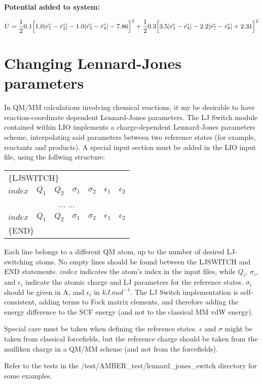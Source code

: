     \textbf{Potential added to system:}

    \begin{equation}
      U=\frac{1}{2} 0.1 \Big{[} 1.0 |\vec{r_1} - \vec{r_2}| - 1.0 |\vec{r_3} - \vec{r_4}| - 7.86\Big{]}^2 + \frac{1}{2} 0.3 \Big{[} 3.5 |\vec{r_1} - \vec{r_3}| - 2.2 |\vec{r_7} - \vec{r_8}| +2.31\Big{]}^2 
      \label{Ex3}
    \end{equation}

\section{Changing Lennard-Jones parameters}
In QM/MM calculations involving chemical reactions, it my be desirable to have reaction-coordinate dependent Lennard-Jones parameters.
The LJ Switch module contained within LIO implements a charge-dependent Lennard-Jones parameters scheme, interpolating said parameters
between two reference states (for example, reactants and products).
A special input section must be added in the LIO input file, using the follwing structure:

    \begin{table}  [H]
      \begin{center}
      \begin{tabular}{ c c c c c c c}
         \multicolumn{7}{l}{\{LJSWITCH\}} \\
         $index$ & $Q_{1}$ & $Q_{2}$ & $\sigma_{1}$ & $\sigma_{2}$ & $\epsilon_{1}$ &  $\epsilon_{2}$ \\
         \multicolumn{7}{c}{... ...} \\
         $index$ & $Q_{1}$ & $Q_{2}$ & $\sigma_{1}$ & $\sigma_{2}$ & $\epsilon_{1}$ &  $\epsilon_{2}$ \\
         \multicolumn{7}{l}{\{END\}} \\
       \end{tabular}
       \end{center}
      \label{ljsinput}
    \end{table}

Each line belongs to a different QM atom, up to the number of desired LJ-switching atoms. No empty lines should be
found between the LJSWITCH and END statements. $index$ indicates the atom's index in the input files, while $Q_{i}$,
$\sigma_{i}$, and $\epsilon_{i}$ indicate the atomic charge and LJ parameters for the reference states. $\sigma_{i}$
should be given in A, and $\epsilon_{i}$ in $kJ.mol^{-1}$. 
The LJ Switch implementation is self-consistent, adding terms to Fock matrix elements, and therefore adding the 
energy difference to the SCF energy (and not to the classical MM vdW energy).

Special care must be taken when defining the reference states. $\epsilon$ and $\sigma$ might be taken from classical
forcefields, but the reference charge should be taken from the mulliken charge in a QM/MM scheme (and not from the
forcefields).

Refer to the tests in the /test/AMBER\_test/lennard\_jones\_switch directory for some examples.